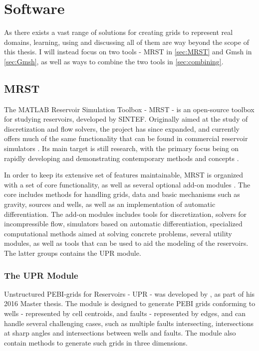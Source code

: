 \section{Software}
As there exists a vast range of solutions for creating grids to represent real domains, learning, using and discussing all of them are way beyond the scope of this thesis. I will instead focus on two tools - MRST in \autoref{sec:MRST} and Gmsh in \autoref{sec:Gmsh}, as well as ways to combine the two tools in \autoref{sec:combining}. 

\subsection{MRST}
\label{sec:MRST}
The MATLAB Reservoir Simulation Toolbox - MRST - is an open-source toolbox for studying reservoirs, developed by SINTEF. Originally aimed at the study of discretization and flow solvers, the project has since expanded, and currently offers much of the same functionality that can be found in commercial reservoir simulators \cite{MRST_book}. Its main target is still research, with the primary focus being on rapidly developing and demonstrating contemporary methods and concepts \cite{MRST_website}.

In order to keep its extensive set of features maintainable, MRST is organized with a set of core functionality, as well as several optional add-on modules \cite{MRST_book}. The core includes methods for handling grids, data and basic mechanisms such as gravity, sources and wells, as well as an implementation of automatic differentiation. The add-on modules includes tools for discretization, solvers for incompressible flow, simulators based on automatic differentiation, specialized computational methods aimed at solving concrete problems, several utility modules, as well as tools that can be used to aid the modeling of the reservoirs. The latter groups contains the UPR module.


\subsubsection{The UPR Module}
\label{sec:UPR}
Unstructured PEBI-grids for Reservoirs - UPR - was developed by \textcite{UPR_thesis}, as part of his 2016 Master thesis. The module is designed to generate PEBI grids conforming to wells - represented by cell centroids, and faults - represented by edges, and can handle several challenging cases, such as multiple faults intersecting, intersections at sharp angles and intersections between wells and faults. The module also contain methods to generate such grids in three dimensions.

